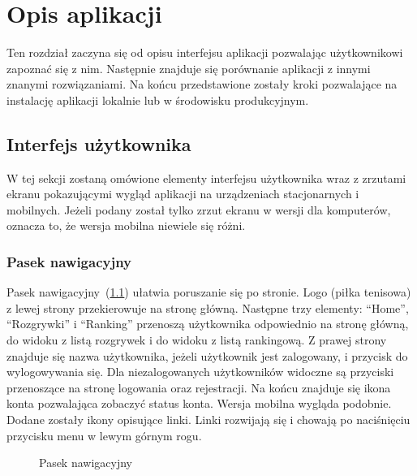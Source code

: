 \documentclass[shortabstract]{iithesis}
\begin{document}
\chapter{Opis aplikacji}
Ten rozdział zaczyna się od opisu interfejsu aplikacji pozwalając użytkownikowi zapoznać się z nim.
Następnie znajduje się porównanie aplikacji z innymi znanymi rozwiązaniami.
Na końcu przedstawione zostały kroki pozwalające na instalację aplikacji lokalnie lub w środowisku produkcyjnym.
\section{Interfejs użytkownika}
W tej sekcji zostaną omówione elementy interfejsu użytkownika wraz z zrzutami ekranu pokazującymi wygląd aplikacji na urządzeniach stacjonarnych i mobilnych.
Jeżeli podany został tylko zrzut ekranu w wersji dla komputerów, oznacza to, że wersja mobilna niewiele się różni.
\subsection{Pasek nawigacyjny}
Pasek nawigacyjny~(\ref{fig:navigation_bar}) ułatwia poruszanie się po stronie. Logo (piłka tenisowa) z lewej strony przekierowuje na stronę główną.
Następne trzy elementy: ``Home'', ``Rozgrywki'' i ``Ranking'' przenoszą użytkownika odpowiednio na stronę główną, do widoku z listą rozgrywek i do widoku z listą rankingową.
Z prawej strony znajduje się nazwa użytkownika, jeżeli użytkownik jest zalogowany, i przycisk do wylogowywania się.
Dla niezalogowanych użytkowników widoczne są przyciski przenoszące na stronę logowania oraz rejestracji.
Na końcu znajduje się ikona konta pozwalająca zobaczyć status konta. Wersja mobilna wygląda podobnie.
Dodane zostały ikony opisujące linki. Linki rozwijają się i chowają po naciśnięciu przycisku menu w lewym górnym rogu.

\newpage
\begin{figure}[H]
    \centering
    \hfill
    \caption{Pasek nawigacyjny}
    \label{fig:navigation_bar}
\end{figure}
\end{document}
